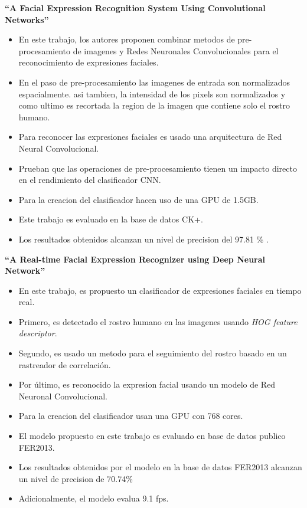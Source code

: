 \textbf{“A Facial Expression Recognition System Using
Convolutional Networks” \cite{lopes2015facial}}\\

\begin{itemize}
\item En este trabajo, los autores proponen combinar metodos de pre-procesamiento de imagenes y Redes Neuronales Convolucionales para el reconocimiento de expresiones faciales.
\item En el paso de pre-procesamiento  las imagenes de entrada son normalizados espacialmente. asi tambien, la intensidad de los pixels son normalizados y como ultimo es recortada la region de la imagen que contiene solo el rostro humano.
\item Para reconocer las expresiones faciales es usado una arquitectura de Red Neural Convolucional.
\item  Prueban que las operaciones de pre-procesamiento tienen un impacto directo en el rendimiento del clasificador CNN.

\item Para la creacion del clasificador hacen uso de una GPU de 1.5GB.
\item Este trabajo es evaluado en la base de datos CK+.

\item Los resultados obtenidos alcanzan un nivel de precision del 97.81 \% .
 
\end{itemize}



\textbf{“A Real-time Facial Expression Recognizer using Deep
Neural Network” \cite{jeon2016real}}\\

\begin{itemize}
\item En este trabajo, es propuesto un  clasificador de expresiones faciales en tiempo real.
\item Primero, es detectado el rostro humano en las imagenes usando \textit{HOG feature descriptor}.
\item Segundo, es usado un metodo para el seguimiento del rostro basado en un rastreador de correlación.
\item Por último, es reconocido la expresion facial usando un modelo de Red Neuronal Convolucional.
\item Para la creacion del clasificador usan una GPU con 768 cores.
\item El modelo propuesto en este trabajo es evaluado en base de datos publico FER2013.
\item Los resultados obtenidos por el  modelo en la base de datos FER2013  alcanzan un nivel de precision de  70.74\%
\item Adicionalmente, el modelo evalua 9.1 fps.
\end{itemize}



